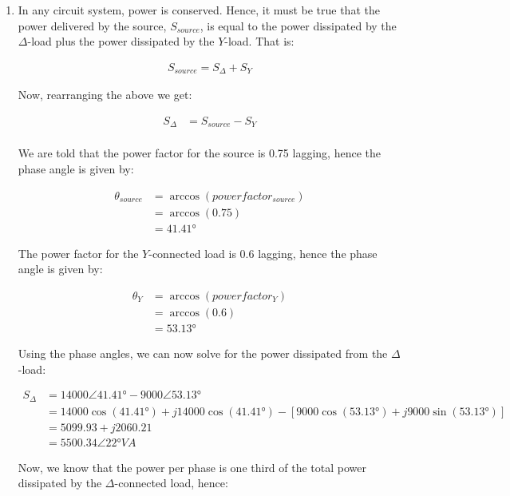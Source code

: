 \documentclass{article}
\begin{document}
\begin{enumerate}
	
	\item
		In any circuit system, power is conserved. Hence, it must be true that the power delivered by the source, $S_{source}$, is equal to the power dissipated by the $\Delta$-load plus the power dissipated by the $Y$-load. That is:
		
		\begin{align*}
			S_{source} = S_\Delta + S_Y
		\end{align*}
		
		Now, rearranging the above we get:
		
		\begin{align*}
			S_\Delta &= S_{source} - S_Y \\
		\end{align*}
		
		We are told that the power factor for the source is 0.75 lagging, hence the phase angle is given by:
		
		\begin{align*}
			\theta_{source} &= \arccos(powerfactor_{source}) \\
			&= \arccos(0.75) \\
			&= 41.41\si{\degree}
		\end{align*}
		 
		The power factor for the $Y$-connected load is 0.6 lagging, hence the phase angle is given by:
		
		\begin{align*}
			\theta_{Y} &= \arccos(powerfactor_{Y}) \\
			&= \arccos(0.6) \\
			&= 53.13\si{\degree}
		\end{align*}
	
		Using the phase angles, we can now solve for the power dissipated from the $\Delta$-load:
		
		\begin{align*}
			S_\Delta &= 14000 \angle 41.41\si{\degree} - 9000 \angle 53.13\si{\degree} \\
			&= 14000 \cos(41.41\si{\degree}) + j14000 \cos(41.41\si{\degree}) - [9000 \cos(53.13\si{\degree}) + j9000 \sin(53.13\si{\degree})] \\
			&= 5099.93 + j2060.21 \\
			&= 5500.34 \angle 22 \si{\degree} \si{VA}
		\end{align*}
		
		Now, we know that the power per phase is one third of the total power dissipated by the $\Delta$-connected load, hence:
		

\end{enumerate}
\end{document}
